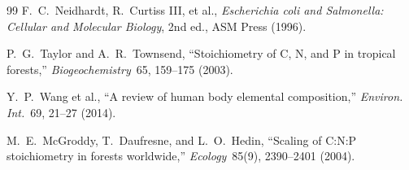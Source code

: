 \begin{thebibliography}{99}
 F.~C.~Neidhardt, R.~Curtiss III, et al., \emph{Escherichia coli and Salmonella: Cellular and Molecular Biology}, 2nd ed., ASM Press (1996).

 P.~G.~Taylor and A.~R.~Townsend, ``Stoichiometry of C, N, and P in tropical forests,'' \emph{Biogeochemistry}\ 65, 159--175 (2003).

 Y.~P.~Wang et al., ``A review of human body elemental composition,'' \emph{Environ. Int.}\ 69, 21--27 (2014).

 M.~E.~McGroddy, T.~Daufresne, and L.~O.~Hedin, ``Scaling of C:N:P stoichiometry in forests worldwide,'' \emph{Ecology}\ 85(9), 2390--2401 (2004).

\end{thebibliography}


